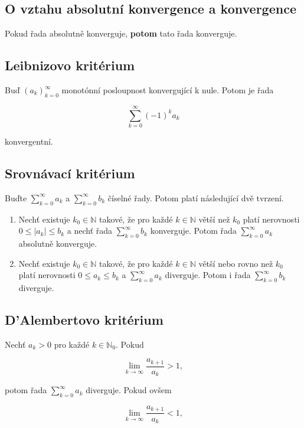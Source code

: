 \subsection*{O vztahu absolutní konvergence a konvergence}

Pokud řada absolutně konverguje, \textbf{potom} tato řada konverguje.

\subsection*{Leibnizovo kritérium}

Buď $(a_k)_{k=0}^\infty$ monotónní posloupnost konvergující k nule. Potom je
řada

\[ \sum_{k=0}^\infty (-1)^k a_k \]

\noindent konvergentní.

\subsection*{Srovnávací kritérium}

Buďte $\sum_{k=0}^\infty a_k$ a $\sum_{k=0}^\infty b_k$ číselné řady. Potom
platí následující dvě tvrzení.

\begin{enumerate}
    \item Nechť existuje $k_0 \in \mathbb{N}$ takové, že pro každé $k\in\mathbb{N}$ větší
          než $k_0$ platí nerovnosti $0 \leq |a_k| \leq b_k$ a nechť řada
          $\sum_{k=0}^\infty b_k$ konverguje. Potom řada $\sum_{k=0}^\infty a_k$
          absolutně konverguje.
    \item Nechť existuje $k_0 \in \mathbb{N}$ takové, že pro každé $k\in\mathbb{N}$ větší
          nebo rovno než $k_0$ platí nerovnosti $0 \leq a_k \leq b_k$ a
          $\sum_{k=0}^\infty a_k$ diverguje. Potom i řada $\sum_{k=0}^\infty b_k$
          diverguje.
\end{enumerate}

\subsection*{D'Alembertovo kritérium}

Nechť $a_k > 0$ pro každé $k\in\mathbb{N}_0$. Pokud

\[ \lim_{k\to\infty} \frac{a_{k+1}}{a_k} > 1, \]

\noindent potom řada $\displaystyle\sum_{k=0}^\infty a_k$ diverguje. Pokud ovšem

\[ \lim_{k\to\infty} \frac{a_{k+1}}{a_k} < 1, \]

